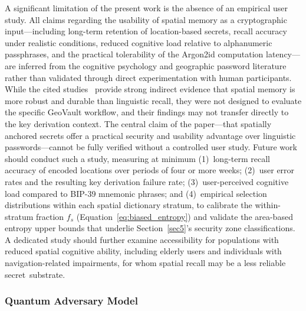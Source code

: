 \documentclass[mathematics,article,accept,pdftex,moreauthors]{Definitions/mdpi}
\begin{document}
{A significant limitation of the present work is the absence of an empirical user study. All claims regarding the usability of spatial memory as a cryptographic input---including long-term retention of location-based secrets, recall accuracy under realistic conditions, reduced cognitive load relative to alphanumeric passphrases, and the practical tolerability of the Argon2id computation latency---are inferred from the cognitive psychology and geographic password literature rather than validated through direct experimentation with human participants. While the cited studies~\cite{Montello1998, McNamara2003, Konkle2010, Lukavsky2017, Thorpe2013, MacRae2016} provide strong indirect evidence that spatial memory is more robust and durable than linguistic recall, they were not designed to evaluate the specific GeoVault workflow, and their findings may not transfer directly to the key derivation context. The central claim of the paper---that spatially anchored secrets offer a practical security and usability advantage over linguistic passwords---cannot be fully verified without a controlled user study. Future work should conduct such a study, measuring at minimum (1)~long-term recall accuracy of encoded locations over periods of four or more weeks; (2)~user error rates and the resulting key derivation failure rate; (3)~user-perceived cognitive load compared to BIP-39 mnemonic phrases; and (4)~empirical selection distributions within each spatial dictionary stratum, to calibrate the within-stratum fraction $f_s$ (Equation~\eqref{eq:biased_entropy}) and validate the area-based entropy upper bounds that underlie Section~\ref{sec5}'s security zone classifications. {A dedicated study should further examine accessibility for populations with reduced spatial cognitive ability, including elderly users and individuals with navigation-related impairments, for whom spatial recall may be a less reliable secret~substrate.}}

\subsubsection*{Quantum Adversary Model}
\end{document}
